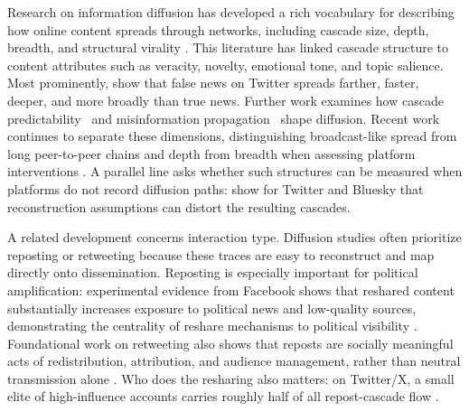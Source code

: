 \documentclass[letterpaper]{article} %
\newcommand{\rev}[1]{{\color{blue}#1}}
\begin{document}
Research on information diffusion has developed a rich vocabulary for describing how online content spreads through networks, including cascade size, depth, breadth, and structural virality \cite{gruhl_information_2004, guille_information_2013, easley_networks_2010, goel_structural_2016}. This literature has linked cascade structure to content attributes such as veracity, novelty, emotional tone, and topic salience. Most prominently, \citet{vosoughi_spread_2018} show that false news on Twitter spreads farther, faster, deeper, and more broadly than true news. Further work examines how cascade predictability~\cite{cheng_can_2014} and misinformation propagation~\cite{zhao_fake_2020} shape diffusion. \rev{Recent work continues to separate these dimensions, distinguishing broadcast-like spread from long peer-to-peer chains \citep{gonzalezbailon_diffusion_2024} and depth from breadth when assessing platform interventions \citep{slaughter_community_2025}. A parallel line asks whether such structures can be measured when platforms do not record diffusion paths: \citet{deverna_cascade_2024} show for Twitter and Bluesky that reconstruction assumptions can distort the resulting cascades.}

A related development concerns interaction type. Diffusion studies often prioritize reposting or retweeting because these traces are easy to reconstruct and map directly onto dissemination. Reposting is especially important for political amplification: experimental evidence from Facebook shows that reshared content substantially increases exposure to political news and low-quality sources, demonstrating the centrality of reshare mechanisms to political visibility \cite{guess_reshare_2023}. Foundational work on retweeting also shows that reposts are socially meaningful acts of redistribution, attribution, and audience management, rather than neutral transmission alone \cite{boyd_tweet_2010, park_expanding_2019}. \rev{Who does the resharing also matters: on Twitter/X, a small elite of high-influence accounts carries roughly half of all repost-cascade flow \citep{niitsuma_prestige_2025}.} 
\end{document}
